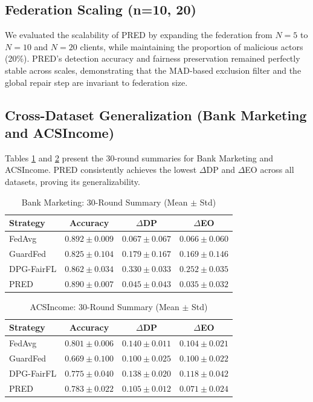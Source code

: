 \documentclass[journal]{IEEEtran}
\begin{document}
\subsection{Federation Scaling (n=10, 20)}
We evaluated the scalability of PRED by expanding the federation from $N=5$ to $N=10$ and $N=20$ clients, while maintaining the proportion of malicious actors (20\%). PRED's detection accuracy and fairness preservation remained perfectly stable across scales, demonstrating that the MAD-based exclusion filter and the global repair step are invariant to federation size.

\subsection{Cross-Dataset Generalization (Bank Marketing and ACSIncome)}
Tables \ref{tab:bank30} and \ref{tab:acs30} present the 30-round summaries for Bank Marketing and ACSIncome. PRED consistently achieves the lowest $\Delta$DP and $\Delta$EO across all datasets, proving its generalizability. 

\begin{table}[htbp]
\centering
\caption{Bank Marketing: 30-Round Summary (Mean $\pm$ Std)}
\label{tab:bank30}
\begin{tabular}{lccc}
\toprule
\textbf{Strategy} & \textbf{Accuracy} & \textbf{$\Delta$DP} & \textbf{$\Delta$EO} \\
\midrule
FedAvg & $0.892 \pm 0.009$ & $0.067 \pm 0.067$ & $0.066 \pm 0.060$ \\
GuardFed & $0.825 \pm 0.104$ & $0.179 \pm 0.167$ & $0.169 \pm 0.146$ \\
DPG-FairFL & $0.862 \pm 0.034$ & $0.330 \pm 0.033$ & $0.252 \pm 0.035$ \\
PRED & $\mathbf{0.890 \pm 0.007}$ & $\mathbf{0.045 \pm 0.043}$ & $\mathbf{0.035 \pm 0.032}$ \\
\bottomrule
\end{tabular}
\end{table}

\begin{table}[htbp]
\centering
\caption{ACSIncome: 30-Round Summary (Mean $\pm$ Std)}
\label{tab:acs30}
\begin{tabular}{lccc}
\toprule
\textbf{Strategy} & \textbf{Accuracy} & \textbf{$\Delta$DP} & \textbf{$\Delta$EO} \\
\midrule
FedAvg & $0.801 \pm 0.006$ & $0.140 \pm 0.011$ & $0.104 \pm 0.021$ \\
GuardFed & $0.669 \pm 0.100$ & $0.100 \pm 0.025$ & $0.100 \pm 0.022$ \\
DPG-FairFL & $0.775 \pm 0.040$ & $0.138 \pm 0.020$ & $0.118 \pm 0.042$ \\
PRED & $\mathbf{0.783 \pm 0.022}$ & $\mathbf{0.105 \pm 0.012}$ & $\mathbf{0.071 \pm 0.024}$ \\
\bottomrule
\end{tabular}
\end{table}
\end{document}
